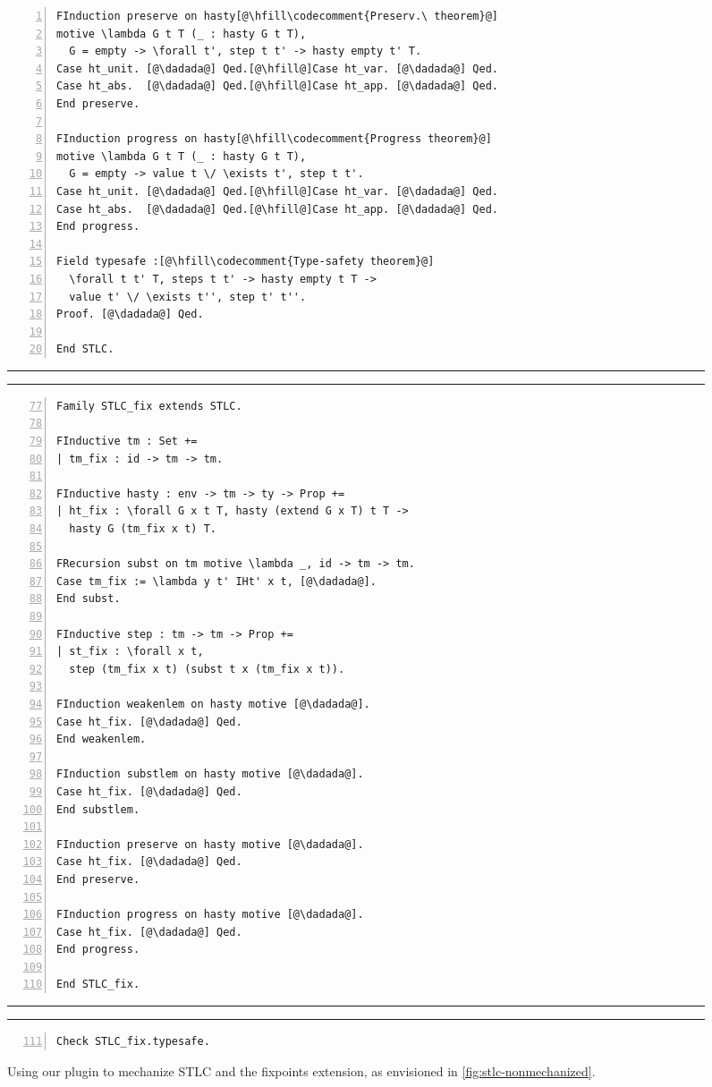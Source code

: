 \begin{figure}
\begin{minipage}{\textwidth}
\begin{multicols}{2}
\begin{lstlisting}[numbers=left]
FInduction preserve on hasty[@\hfill\codecomment{Preserv.\ theorem}@]
motive \lambda G t T (_ : hasty G t T),
  G = empty -> \forall t', step t t' -> hasty empty t' T.
Case ht_unit. [@\dadada@] Qed.[@\hfill@]Case ht_var. [@\dadada@] Qed.
Case ht_abs.  [@\dadada@] Qed.[@\hfill@]Case ht_app. [@\dadada@] Qed.
End preserve.

FInduction progress on hasty[@\hfill\codecomment{Progress theorem}@]
motive \lambda G t T (_ : hasty G t T),
  G = empty -> value t \/ \exists t', step t t'.
Case ht_unit. [@\dadada@] Qed.[@\hfill@]Case ht_var. [@\dadada@] Qed.
Case ht_abs.  [@\dadada@] Qed.[@\hfill@]Case ht_app. [@\dadada@] Qed.
End progress.

Field typesafe :[@\hfill\codecomment{Type-safety theorem}@]
  \forall t t' T, steps t t' -> hasty empty t T ->
  value t' \/ \exists t'', step t' t''.
Proof. [@\dadada@] Qed.

End STLC.
\end{lstlisting}
\medskip

\hrule
\hrule
\medskip

\begin{lstlisting}[numbers=left,firstnumber=77]
Family STLC_fix extends STLC.

FInductive tm : Set +=
| tm_fix : id -> tm -> tm.

FInductive hasty : env -> tm -> ty -> Prop +=
| ht_fix : \forall G x t T, hasty (extend G x T) t T ->
  hasty G (tm_fix x t) T.

FRecursion subst on tm motive \lambda _, id -> tm -> tm.
Case tm_fix := \lambda y t' IHt' x t, [@\dadada@].
End subst.

FInductive step : tm -> tm -> Prop +=
| st_fix : \forall x t,
  step (tm_fix x t) (subst t x (tm_fix x t)).

FInduction weakenlem on hasty motive [@\dadada@].
Case ht_fix. [@\dadada@] Qed.
End weakenlem.

FInduction substlem on hasty motive [@\dadada@].
Case ht_fix. [@\dadada@] Qed.
End substlem.

FInduction preserve on hasty motive [@\dadada@].
Case ht_fix. [@\dadada@] Qed.
End preserve.

FInduction progress on hasty motive [@\dadada@].
Case ht_fix. [@\dadada@] Qed.
End progress.

End STLC_fix.
\end{lstlisting}
\medskip

\hrule
\hrule
\medskip

\begin{lstlisting}[numbers=left,firstnumber=111]
Check STLC_fix.typesafe.
\end{lstlisting}

\end{multicols}
\end{minipage}
\caption{Using our plugin to mechanize STLC and the fixpoints extension,
as envisioned in \cref{fig:stlc-nonmechanized}.}
\label{fig:stlc-mechanized}
\end{figure}




